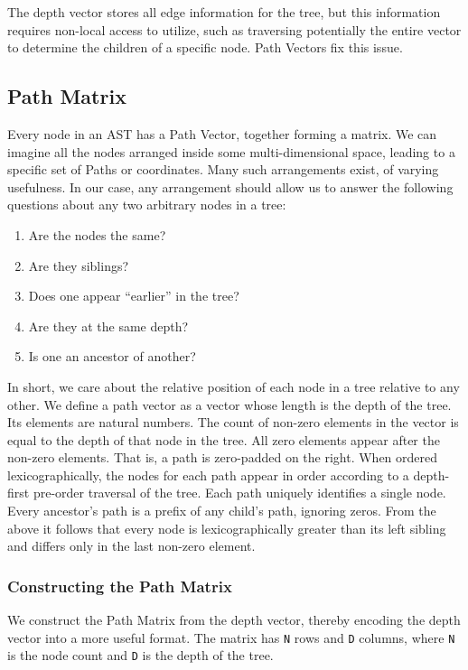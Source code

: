 ﻿\documentclass[numbers,10pt,preprint]{sigplanconf}
\begin{document}
\noindent The depth vector stores all edge information for the tree, but this information requires non-local access to utilize, such as traversing potentially the entire vector to determine the children of a specific node. Path Vectors fix this issue.

\subsection{Path Matrix}

Every node in an AST has a Path Vector, together forming a matrix.  We can imagine all the nodes arranged inside some multi-dimensional space, leading to a specific set of Paths or coordinates. Many such arrangements exist, of varying usefulness. In our case, any arrangement should allow us to answer the following questions about any two arbitrary nodes in a tree:

\begin{enumerate}[noitemsep]
\item Are the nodes the same?
\item Are they siblings?
\item Does one appear ``earlier'' in the tree?
\item Are they at the same depth?
\item Is one an ancestor of another?
\end{enumerate}

\noindent In short, we care about the relative position of each node in a tree relative to any other. We define a path vector as a vector whose length is the depth of the tree. Its elements are natural numbers.  The count of non-zero elements in the vector is equal to the depth of that node in the tree. All zero elements appear after the non-zero elements. That is, a path is zero-padded on the right. When ordered lexicographically, the nodes for each path appear in order according to a depth-first pre-order traversal of the tree. Each path uniquely identifies a single node. Every ancestor’s path is a prefix of any child’s path, ignoring zeros. From the above it follows that every node is lexicographically greater than its left sibling and differs only in the last non-zero element.

\subsubsection{Constructing the Path Matrix}

We construct the Path Matrix from the depth vector, thereby encoding the depth vector into a more useful format. The matrix has \verb;N; rows and \verb;D; columns, where \verb;N; is the node count and \verb;D; is the depth of the tree.
\end{document}
